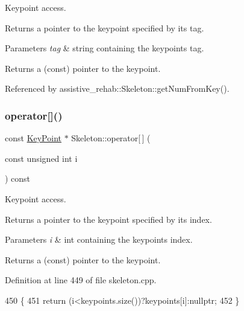 Keypoint access. 

Returns a pointer to the keypoint specified by its tag. 
\begin{DoxyParams}{Parameters}
{\em tag} & string containing the keypoint\textquotesingle{}s tag. \\
\hline
\end{DoxyParams}
\begin{DoxyReturn}{Returns}
a (const) pointer to the keypoint. 
\end{DoxyReturn}


Referenced by assistive\+\_\+rehab\+::\+Skeleton\+::get\+Num\+From\+Key().

\mbox{\label{classassistive__rehab_1_1Skeleton_a0692ab89f16b0914b9ca9e0d4a07e52c}} 
\subsubsection{\texorpdfstring{operator[]()}{operator[]()}\hspace{0.1cm}{\footnotesize\ttfamily [2/2]}}
{\footnotesize\ttfamily const \hyperlink{classassistive__rehab_1_1KeyPoint}{Key\+Point} $\ast$ Skeleton\+::operator\mbox{[}$\,$\mbox{]} (\begin{DoxyParamCaption}\item[{const unsigned int}]{i }\end{DoxyParamCaption}) const\hspace{0.3cm}{\ttfamily [inherited]}}



Keypoint access. 

Returns a pointer to the keypoint specified by its index. 
\begin{DoxyParams}{Parameters}
{\em i} & int containing the keypoint\textquotesingle{}s index. \\
\hline
\end{DoxyParams}
\begin{DoxyReturn}{Returns}
a (const) pointer to the keypoint. 
\end{DoxyReturn}


Definition at line 449 of file skeleton.\+cpp.


\begin{DoxyCode}
450 \{
451     \textcolor{keywordflow}{return} (i<keypoints.size())?keypoints[i]:\textcolor{keyword}{nullptr};
452 \}
\end{DoxyCode}
\mbox{\label{classassistive__rehab_1_1Skeleton_a21fded128e2240e4dd507030b7386670}} 
